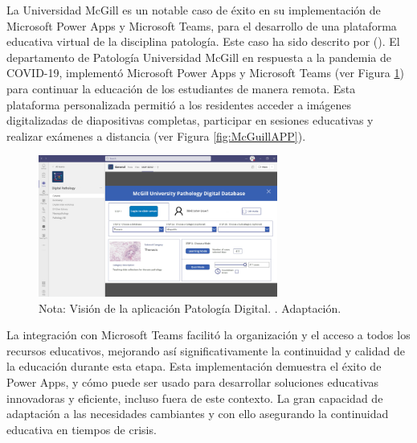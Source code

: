 \documentclass[letter,oneside,12pt,spanish]{report}
\begin{document}
\noindent La Universidad McGill es un notable caso de éxito en su implementación de Microsoft Power Apps y Microsoft Teams, para el desarrollo de una plataforma educativa virtual de la disciplina patología. Este caso ha sido descrito por (\cite{rajaram2022pathology}). El departamento de Patología Universidad McGill en respuesta a la pandemia de COVID-19, implementó Microsoft Power Apps y Microsoft Teams (ver Figura \ref{fig:McGuill}) para continuar la educación de los estudiantes de manera remota. Esta plataforma personalizada permitió a los residentes acceder a imágenes digitalizadas de diapositivas completas, participar en sesiones educativas y realizar exámenes a distancia (ver Figura \ref{fig:McGuillAPP}).


\begin{figure}[ht]
    \centering
    \includegraphics[width=0.7\textwidth]{Figs/mcgill university.png}
    \label{fig:McGuill}
    \\Nota: Visión de la aplicación Patología Digital. \cite{rajaram2022pathology}. Adaptación.
\end{figure}



\noindent La integración con Microsoft Teams facilitó la organización y el acceso a todos los recursos educativos, mejorando así significativamente la continuidad y calidad de la educación durante esta etapa. Esta implementación demuestra el éxito de Power Apps, y cómo puede ser usado para desarrollar soluciones educativas innovadoras y eficiente, incluso fuera de este contexto. La gran capacidad de adaptación a las necesidades cambiantes y con ello asegurando la continuidad educativa en tiempos de crisis.
\end{document}
